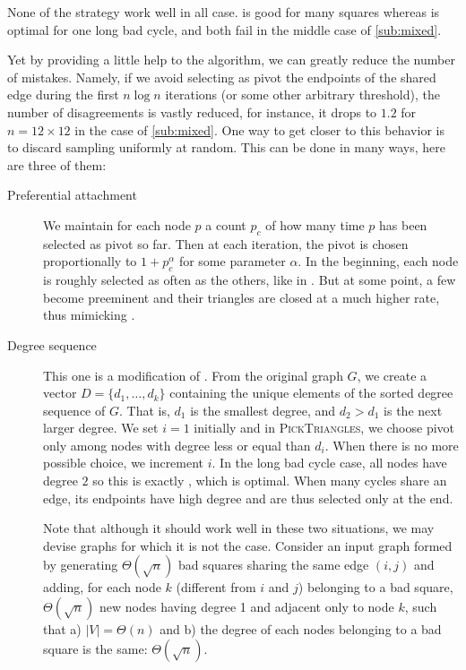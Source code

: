 None of the strategy work well in all case. \pot{} is good for many squares
whereas \pat{} is optimal for one long bad cycle, and both fail in the middle
case of \autoref{sub:mixed}.

Yet by providing a little help to the algorithm, we can greatly reduce the
number of mistakes. Namely, if we avoid selecting as pivot the endpoints of
the shared edge during the first $n\log n$ iterations (or some other arbitrary
threshold), the number of disagreements is vastly reduced, for instance, it
drops to $1.2$ for $n=12\times 12$ in the case of \autoref{sub:mixed}.  One
way to get closer to this behavior is to discard sampling uniformly at random.
This can be done in many ways, here are three of them:

\begin{description}
	\item[Preferential attachment] We maintain for each node $p$ a count
		$p_c$ of how many time $p$ has been selected as pivot so far. Then at
		each iteration, the pivot is chosen proportionally to $1+p_c^\alpha$ for
		some parameter $\alpha$.
		In the beginning, each node is roughly selected as often as the
		others, like in \pot{}. But at some point, a few become preeminent
		and their triangles are closed at a much higher rate, thus
		mimicking \pat{}.
	\item[Degree sequence] This one is a modification of \pat{}. From the
		original graph $G$, we create a vector $D=\{d_1, \ldots, d_k\}$
		containing the unique elements of the sorted degree sequence of $G$.
		That is,
		$d_1$ is the smallest degree, and $d_2 > d_1$ is the next larger  degree.
	We set $i=1$ initially and in \textsc{PickTriangles}, we choose pivot
	only among nodes with degree less or equal than $d_i$. When there is no more
	possible choice, we increment $i$. In the long bad cycle case, all nodes
	have degree $2$ so this is exactly \pat{}, which is optimal. When many
	cycles share an edge, its endpoints have high degree and are thus
	selected only at the end.

	Note that although it should work well in these two situations, we may
	devise graphs for which it is not the case. 
	Consider an input graph formed by generating $\Theta(\sqrt{n})$ bad
	squares sharing the same edge $(i,j)$ and adding, for each node $k$
	(different from $i$ and $j$) belonging to a bad square, $\Theta(\sqrt n)$
	new nodes having degree 1 and adjacent only to node $k$, such that a)
	$|V|=\Theta(n)$ and b) the degree of each nodes belonging to a bad square is
	the same: $\Theta(\sqrt{n})$.


\end{description}
